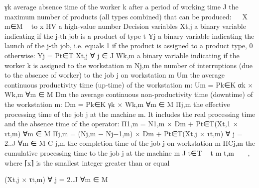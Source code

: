 γk	average absence time of the worker k after a period of working time
J	the maximum number of products (all types combined) that can be produced:
		
X
		m∈M	 to x
HV	a high-value number
Decision variables
Xt,j	a binary variable indicating if the j-th job is a product of type t
Yj	a binary variable indicating the launch of the j-th job, i.e. equals 1 if the product is assigned to a product type, 0 otherwise: Yj = Pt∈T Xt,j ∀ j ∈ J
Wk,m	a binary variable indicating if the worker k is assigned to the workstation m
Nj,m	the number of interruptions (due to the absence of worker) to the job j on workstation m
Um	the average continuous productivity time (up-time) of the workstation m:
Um = Pk∈K αk × Wk,m	∀m ∈ M
Dm	the average continuous non-productivity time (downtime) of the workstation m:
Dm = Pk∈K γk × Wk,m	∀m ∈ M
Πj,m	the effective processing time of the job j at the machine m. It includes the real processing time and the absence time of the operator:
Π1,m = N1,m × Dm + Pt∈T(Xt,1 × τt,m)	∀m ∈ M
Πj,m = (Nj,m − Nj−1,m) × Dm + Pt∈T(Xt,j × τt,m)	∀ j = 2..J	∀m ∈ M
C j,m	the completion time of the job j on workstation m
ΠCj,m	the cumulative processing time to the job j at the machine m
J	 t∈T 	t m	t,m, where ⌈x⌉ is the smallest integer greater than or equal

 
	 (Xt,j × τt,m)	∀ j = 2..J	∀m ∈ M
 
